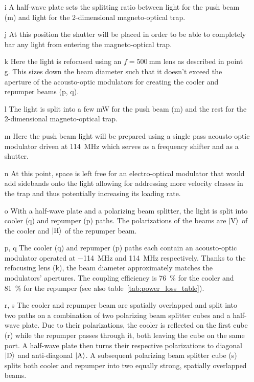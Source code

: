 \begin{itemize}
    \item[i] A half-wave plate sets the splitting ratio between light for the push beam (m) and light for the 2-dimensional magneto-optical trap.
    
    \item[j] At this position the shutter will be placed in order to be able to completely bar any light from entering the magneto-optical trap.
    
    \item[k] Here the light is refocused using an $f = \SI{500}{\milli\meter}$ lens as described in point g. This sizes down the beam diameter such that it doesn't exceed the aperture of the acousto-optic modulators for creating the cooler and repumper beams (p, q).
    
    \item[l] The light is split into a few \si{\milli\watt} for the push beam (m) and the rest for the 2-dimensional magneto-optical trap.

    \item[m] Here the push beam light will be prepared using a single pass acousto-optic modulator driven at \SI{+114}{\mega\hertz} which serves as a frequency shifter and as a shutter.
    
    \item[n] At this point, space is left free for an electro-optical modulator that would add sidebands onto the light allowing for addressing more velocity classes in the trap and thus potentially increasing its loading rate.
    
    \item[o] With a half-wave plate and a polarizing beam splitter, the light is split into cooler (q) and repumper (p) paths. The polarizations of the beams are $\Ket{\text{V}}$ of the cooler and $\Ket{\text{H}}$ of the repumper beam.
    
    \item[p, q] The cooler (q) and repumper (p) paths each contain an acousto-optic modulator operated at \SI{-114}{\mega\hertz} and \SI{+114}{\mega\hertz} respectively. Thanks to the refocusing lens (k), the beam diameter approximately matches the modulators' apertures. The coupling efficiency is \SI{76}{\percent} for the cooler and \SI{81}{\percent} for the repumper (see also table~\ref{tab:power_loss_table}).
    
    \item[r, s] The cooler and repumper beam are spatially overlapped and split into two paths on a combination of two polarizing beam splitter cubes and a half-wave plate. Due to their polarizations, the cooler is reflected on the first cube (r) while the repumper passes through it, both leaving the cube on the same port. A half-wave plate then turns their respective polarizations to diagonal $\Ket{\text{D}}$ and anti-diagonal $\Ket{\text{A}}$. A subsequent polarizing beam splitter cube (s) splits both cooler and repumper into two equally strong, spatially overlapped beams.
    

\end{itemize}
